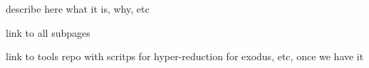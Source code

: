 
\begin{DoxyItemize}
\item describe here what it is, why, etc
\item link to all subpages
\item link to tools repo with scritps for hyper-\/reduction for exodus, etc, once we have it 
\end{DoxyItemize}